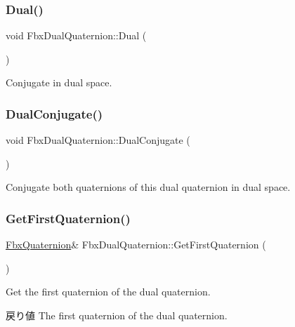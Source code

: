 \subsubsection{\texorpdfstring{Dual()}{Dual()}}
{\footnotesize\ttfamily void Fbx\+Dual\+Quaternion\+::\+Dual (\begin{DoxyParamCaption}{ }\end{DoxyParamCaption})}

Conjugate in dual space. \mbox{\label{class_fbx_dual_quaternion_ad371018282581c2120cd5e0a9dfe456b}} 
\subsubsection{\texorpdfstring{Dual\+Conjugate()}{DualConjugate()}}
{\footnotesize\ttfamily void Fbx\+Dual\+Quaternion\+::\+Dual\+Conjugate (\begin{DoxyParamCaption}{ }\end{DoxyParamCaption})}

Conjugate both quaternions of this dual quaternion in dual space. \mbox{\label{class_fbx_dual_quaternion_aeec210c98cc1a64b097e4e9374a87e51}} 
\subsubsection{\texorpdfstring{Get\+First\+Quaternion()}{GetFirstQuaternion()}\hspace{0.1cm}{\footnotesize\ttfamily [1/2]}}
{\footnotesize\ttfamily \hyperlink{class_fbx_quaternion}{Fbx\+Quaternion}\& Fbx\+Dual\+Quaternion\+::\+Get\+First\+Quaternion (\begin{DoxyParamCaption}{ }\end{DoxyParamCaption})}

Get the first quaternion of the dual quaternion. \begin{DoxyReturn}{戻り値}
The first quaternion of the dual quaternion. 
\end{DoxyReturn}
\mbox{\label{class_fbx_dual_quaternion_a31eb96dba8793d778d486fb73534bfa1}} 

